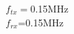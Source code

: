 \documentclass[preview]{standalone}
\begin{document}
\begin{center}
$f_{tx}=$0.15MHz\\$f_{rx}$=0.15MHz
\end{center}
\end{document}
